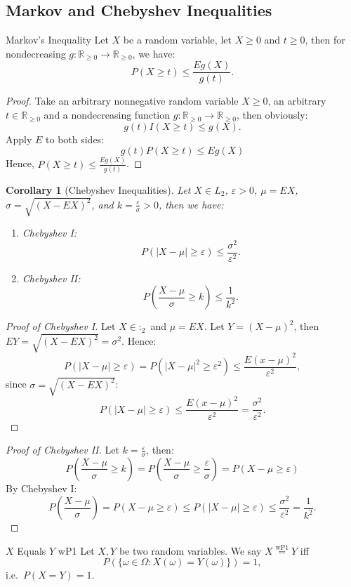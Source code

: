 \documentclass[11pt]{article}
\makeatletter
\newenvironment{definition}[1]{\begin{defbox}{#1}{}}{\end{defbox}}
\newenvironment{theorem}[1]{\begin{thmbox}{#1}{}}{\end{thmbox}}
\theoremstyle{quiet}
\newtheorem{corollary}[tcb@cnt@defbox]{Corollary}
\theoremstyle{quietremark}
\newcommand{\1}{\mathbf{1}}            %
\makeatother
\begin{document}
\subsection{Markov and Chebyshev Inequalities}
\begin{theorem}{Markov's Inequality}
Let $X$ be a random variable, let $X\ge 0$ and $t\ge 0$, then for nondecreasing $g:\mathbb{R}_{\ge 0}\to\mathbb{R}_{\ge 0}$, we have:
\[
P(X\ge t)\le\frac{Eg(X)}{g(t)}.
\]
\end{theorem}

\begin{proof}
Take an arbitrary nonnegative random variable $X\ge 0$, an arbitrary $t\in\mathbb{R}_{\ge 0}$ and a nondecreasing function $g:\mathbb{R}_{\ge 0}\to\mathbb{R}_{\ge 0}$, then obviously:
\[
g(t)I(X\ge t)\le g(X).
\]
Apply $E$ to both sides:
\[
g(t)P(X\ge t)\le Eg(X)
\]
Hence, $\displaystyle P(X\ge t)\le\frac{Eg(X)}{g(t)}$.
\end{proof}
\newpage
\begin{corollary}[Chebyshev Inequalities]
Let $X\in L_2$, $\varepsilon>0$, $\mu=EX$, $\sigma=\sqrt{(X-EX)^2}$, and $\displaystyle k=\frac{\varepsilon}{\sigma}>0$, then we have:
\begin{enumerate}
\item Chebyshev I: 
\[
\displaystyle P(|X-\mu|\ge \varepsilon)\le\frac{\sigma^2}{\varepsilon^2}.
\]
\item Chebyshev II: 
\[
\displaystyle P\left(\frac{X-\mu}{\sigma}\ge k\right)\le \frac{1}{k^2}.
\]
\end{enumerate}
\end{corollary}

\begin{proof}[Proof of Chebyshev I]
Let $X\in :_2$ and $\mu=EX$. Let $Y=(X-\mu)^2$, then $EY=\sqrt{(X-EX)^2}=\sigma^2$. Hence:
\[
P(|X-\mu|\ge \varepsilon)=P(|X-\mu|^2\ge\varepsilon^2)\le\frac{E(x-\mu)^2}{\varepsilon^2},
\]
since $\sigma=\sqrt{(X-EX)^2}$:
\[
P(|X-\mu|\ge\varepsilon)\le\frac{E(x-\mu)^2}{\varepsilon^2}=\frac{\sigma^2}{\varepsilon^2}.
\]
\end{proof}

\begin{proof}[Proof of Chebyshev II]
Let $\displaystyle k=\frac{\varepsilon}{\sigma}$, then:
\[
P\left(\frac{X-\mu}{\sigma}\ge k\right)=P\left(\frac{X-\mu}{\sigma}\ge\frac{\varepsilon}{\sigma}\right)=P(X-\mu\ge\varepsilon)
\]
By Chebyshev I:
\[
P\left(\frac{X-\mu}{\sigma}\right)=P(X-\mu\ge\varepsilon)\le P(|X-\mu|\ge\varepsilon)\le\frac{\sigma^2}{\varepsilon^2}=\frac{1}{k^2}.
\]
\end{proof}
\begin{definition}{$X$ Equals $Y$ wP1}
Let $X, Y$ be two random variables.
We say $X \overset{\text{wP1}}{=} Y$ iff
\[
P(\{\omega \in \Omega : X(\omega) = Y(\omega)\}) = 1,
\]
i.e.\ $P(X = Y) = 1$.
\end{definition}
\end{document}
